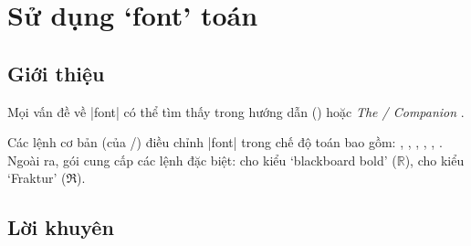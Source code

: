 \documentclass[11pt,leqno,titlepage,openany]{amsldoc}[1999/12/13]
\newcommand{\booktitle}[1]{\textit{#1}}
\begin{document}
\chapter{Sử dụng `font' toán}

\section{Giới thiệu}

Mọi vấn đề về |font| có thể tìm thấy trong hướng dẫn ()
hoặc \booktitle{The \latex/ Companion} \cite{tlc}.

\medskip
Các lệnh cơ bản (của \latex/)
điều chỉnh |font| trong chế độ toán bao gồm:
, , , , , .
Ngoài ra, gói  cung cấp các lệnh đặc biệt:
 cho kiểu `blackboard bold' ($\mathbb R$),
 cho kiểu `Fraktur' ($\mathfrak R$).

\section{Lời khuyên}
\end{document}
